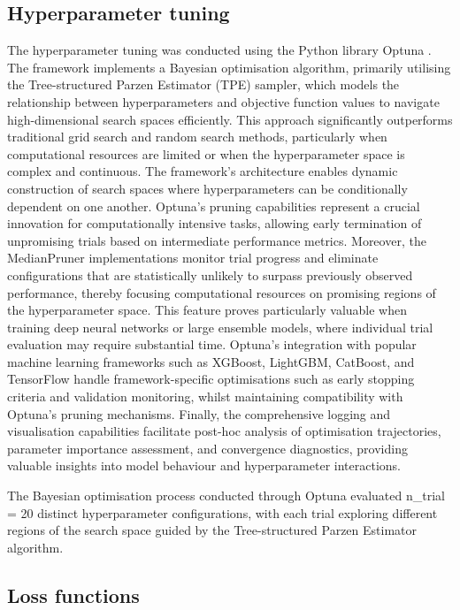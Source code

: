 \documentclass[nhess, manuscript]{copernicus}
\begin{document}
\subsection{Hyperparameter tuning}

The hyperparameter tuning was conducted using the Python library Optuna \citep{Akiba_2019}. The framework implements a Bayesian optimisation algorithm, primarily utilising the Tree-structured Parzen Estimator (TPE) sampler, which models the relationship between hyperparameters and objective function values to navigate high-dimensional search spaces efficiently. This approach significantly outperforms traditional grid search and random search methods, particularly when computational resources are limited or when the hyperparameter space is complex and continuous. The framework's architecture enables dynamic construction of search spaces where hyperparameters can be conditionally dependent on one another. Optuna's pruning capabilities represent a crucial innovation for computationally intensive tasks, allowing early termination of unpromising trials based on intermediate performance metrics. Moreover, the MedianPruner implementations monitor trial progress and eliminate configurations that are statistically unlikely to surpass previously observed performance, thereby focusing computational resources on promising regions of the hyperparameter space. This feature proves particularly valuable when training deep neural networks or large ensemble models, where individual trial evaluation may require substantial time. Optuna's integration with popular machine learning frameworks such as XGBoost, LightGBM, CatBoost, and TensorFlow handle framework-specific optimisations such as early stopping criteria and validation monitoring, whilst maintaining compatibility with Optuna's pruning mechanisms. Finally, the comprehensive logging and visualisation capabilities facilitate post-hoc analysis of optimisation trajectories, parameter importance assessment, and convergence diagnostics, providing valuable insights into model behaviour and hyperparameter interactions.

The Bayesian optimisation process conducted through Optuna evaluated n\_trial = 20 distinct hyperparameter configurations, with each trial exploring different regions of the search space guided by the Tree-structured Parzen Estimator algorithm.


\subsection{Loss functions}
\end{document}
